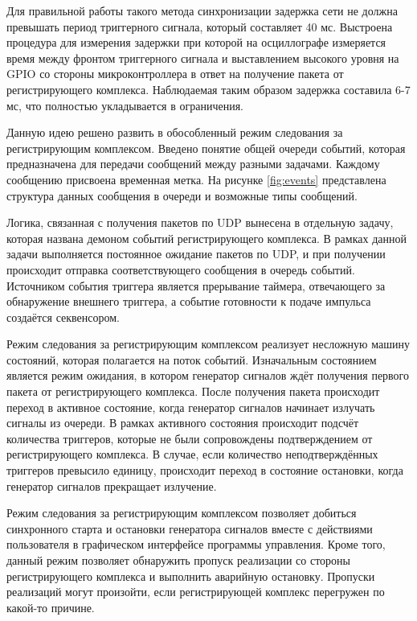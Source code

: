 \documentclass{report}
\begin{document}
Для правильной работы такого метода синхронизации задержка сети не должна превышать период триггерного сигнала, который составляет 40 мс. Выстроена процедура для измерения задержки при которой на осциллографе измеряется время между фронтом триггерного сигнала и выставлением высокого уровня на GPIO со стороны микроконтроллера в ответ на получение пакета от регистрирующего комплекса. Наблюдаемая таким образом задержка составила 6-7 мс, что полностью укладывается в ограничения.


Данную идею решено развить в обособленный режим следования за регистрирующим комплексом. Введено понятие общей очереди событий, которая предназначена для передачи сообщений между разными задачами. Каждому сообщению присвоена временная метка. На рисунке \ref{fig:events} представлена структура данных сообщения в очереди и возможные типы сообщений.


Логика, связанная с получения пакетов по UDP вынесена в отдельную задачу, которая названа демоном событий регистрирующего комплекса. В рамках данной задачи выполняется постоянное ожидание пакетов по UDP, и при получении происходит отправка соответствующего сообщения в очередь событий. Источником события триггера является прерывание таймера, отвечающего за обнаружение внешнего триггера, а событие готовности к подаче импульса создаётся секвенсором.

Режим следования за регистрирующим комплексом реализует несложную машину состояний, которая полагается на поток событий. Изначальным состоянием является режим ожидания, в котором генератор сигналов ждёт получения первого пакета от регистрирующего комплекса. После получения пакета происходит переход в активное состояние, когда генератор сигналов начинает излучать сигналы из очереди. В рамках активного состояния происходит подсчёт количества триггеров, которые не были сопровождены подтверждением от регистрирующего комплекса. В случае, если количество неподтверждённых триггеров превысило единицу, происходит переход в состояние остановки, когда генератор сигналов прекращает излучение.

Режим следования за регистрирующим комплексом позволяет добиться синхронного старта и остановки генератора сигналов вместе с действиями пользователя в графическом интерфейсе программы управления. Кроме того, данный режим позволяет обнаружить пропуск реализации со стороны регистрирующего комплекса и выполнить аварийную остановку. Пропуски реализаций могут произойти, если регистрирующей комплекс перегружен по какой-то причине.
\end{document}
